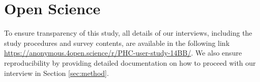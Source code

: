 \section{Open Science}
 To ensure transparency of this study, all details of our interviews, including the study procedures and survey contents, are available in the following link \url{https://anonymous.4open.science/r/PHC-user-study-14BB/}. We also ensure reproducibility by providing detailed documentation on how to proceed with our interview in Section \ref{sec:method}.